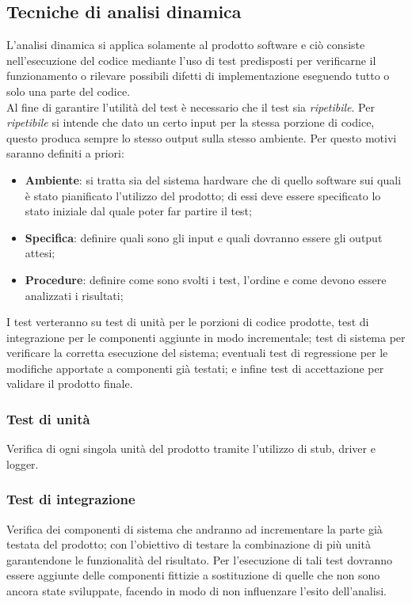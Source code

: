 \subsection{Tecniche di analisi dinamica}
L'analisi dinamica si applica solamente al prodotto software e ciò consiste nell'esecuzione del codice mediante l'uso di test predisposti per verificarne il funzionamento o rilevare possibili difetti di implementazione eseguendo tutto o solo una parte del codice.\\
Al fine di garantire l'utilità del test è necessario che il test sia \textit{ripetibile}. Per \textit{ripetibile} si intende che dato un certo input per la stessa porzione di codice, questo produca sempre lo stesso output sulla stesso ambiente. Per questo motivi saranno definiti a priori:
\begin{itemize}
\item \textbf{Ambiente}: si tratta sia del sistema hardware che di quello software sui quali è stato pianificato l'utilizzo del prodotto; di essi deve essere specificato lo stato iniziale dal quale poter far partire il test;
\item \textbf{Specifica}: definire quali sono gli input e quali dovranno essere gli output attesi;
\item \textbf{Procedure}: definire come sono svolti i test, l'ordine e come devono essere analizzati i risultati;
\end{itemize}
I test verteranno su test di unità per le porzioni di codice prodotte, test di integrazione per le componenti aggiunte in modo incrementale; test di sistema per verificare la corretta esecuzione del sistema; eventuali test di regressione per le modifiche apportate a componenti già testati; e infine test di accettazione per validare il prodotto finale.
\subsubsection{Test di unità}
Verifica di ogni singola unità del prodotto tramite l'utilizzo di stub, driver e logger.
\subsubsection{Test di integrazione}
Verifica dei componenti di sistema che andranno ad incrementare la parte già testata del prodotto; con l'obiettivo di testare la combinazione di più unità garantendone le funzionalità del risultato.
Per l'esecuzione di tali test dovranno essere aggiunte delle componenti fittizie a sostituzione di quelle che non sono ancora state sviluppate, facendo in modo di non influenzare l'esito dell'analisi.
